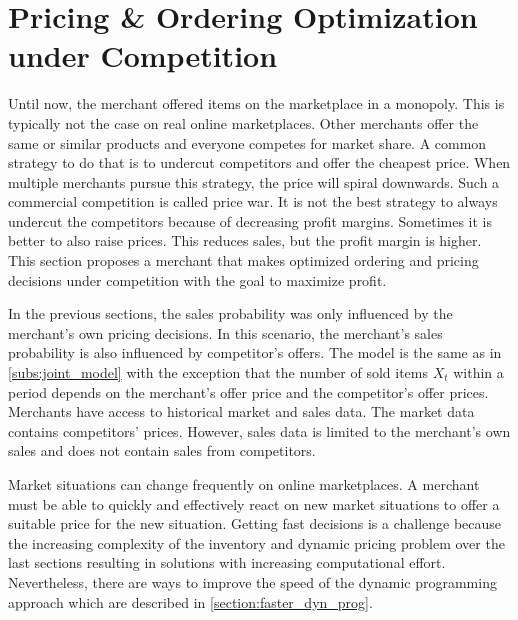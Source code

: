 \section{Pricing \& Ordering Optimization under Competition}
\label{section:competition}
Until now, the merchant offered items on the marketplace in a monopoly.
This is typically not the case on real online marketplaces.
Other merchants offer the same or similar products and everyone competes for market share.
A common strategy to do that is to undercut competitors and offer the cheapest price.
When multiple merchants pursue this strategy, the price will spiral downwards.
Such a commercial competition is called price war.
It is not the best strategy to always undercut the competitors because of decreasing profit margins.
Sometimes it is better to also raise prices.
This reduces sales, but the profit margin is higher.
This section proposes a merchant that makes optimized ordering and pricing decisions under competition with the goal to maximize profit.

In the previous sections, the sales probability was only influenced by the merchant's own pricing decisions.
In this scenario, the merchant's sales probability is also influenced by competitor's offers.
The model is the same as in \cref{subs:joint_model} with the exception that the number of sold items $X_t$ within a period depends on the merchant's offer price and the competitor's offer prices.
Merchants have access to historical market and sales data.
The market data contains competitors' prices.
However, sales data is limited to the merchant's own sales and does not contain sales from competitors.

Market situations can change frequently on online marketplaces.
A merchant must be able to quickly and effectively react on new market situations to offer a suitable price for the new situation.
Getting fast decisions is a challenge because the increasing complexity of the inventory and dynamic pricing problem over the last sections resulting in solutions with increasing computational effort.
Nevertheless, there are ways to improve the speed of the dynamic programming approach which are described in \cref{section:faster_dyn_prog}.

